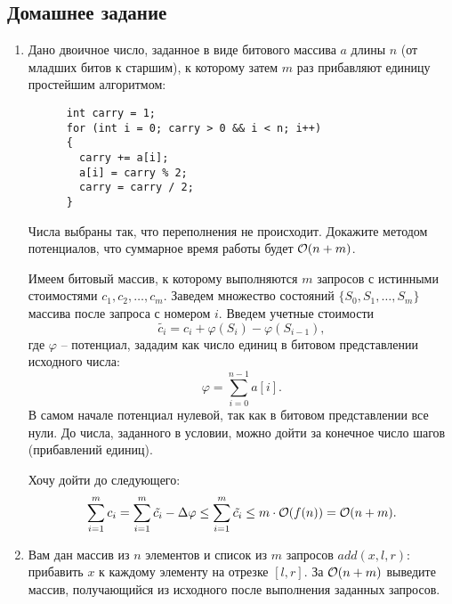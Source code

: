 \subsection{Домашнее задание}
\begin{enumerate}

  \item
    Дано двоичное число, заданное в виде битового массива $a$ длины $n$ (от младших битов к старшим), к которому
    затем $m$ раз прибавляют единицу простейшим алгоритмом:
    \begin{lstlisting}
      int carry = 1;
      for (int i = 0; carry > 0 && i < n; i++)
      {
        carry += a[i];
        a[i] = carry % 2;
        carry = carry / 2;
      }
    \end{lstlisting}
    Числа выбраны так, что переполнения не происходит. Докажите методом потенциалов, что суммарное время
    работы будет $\mathcal{O}(n + m)$.
    \begin{solution}
      Имеем битовый массив, к которому выполняются $m$ запросов с истинными стоимостями $c_1, c_2, \ldots, c_m$. Заведем множество состояний $\{S_0, S_1, \ldots, S_m\}$ массива после запроса с номером $i$. Введем учетные стоимости
      \begin{equation}
        \tilde{c_i} = c_i + \varphi(S_i) - \varphi(S_{i-1}),
      \end{equation}
      где $\varphi$ -- потенциал, зададим как число единиц в битовом представлении исходного числа:
      \begin{equation}
        \varphi = \sum_{i = 0}^{n - 1} a[i].
      \end{equation}
      В самом начале потенциал нулевой, так как в битовом представлении все нули. До числа, заданного в условии, можно дойти за конечное число шагов (прибавлений единиц).

      Хочу дойти до следующего:
      \begin{equation}
        \sum_{i = 1}^{m} c_i = \sum_{i = 1}^{m} \tilde{c_i} - \Delta \varphi \leq \sum_{i = 1}^{m} \tilde{c_i} \leq m \cdot \mathcal{O}(f(n)) = \mathcal{O}(n + m).
      \end{equation}
    \end{solution}

  \item
    Вам дан массив из $n$ элементов и
    список из $m$ запросов $add(x, l, r)$: прибавить $x$ к каждому
    элементу на отрезке $[l, r]$. За $\mathcal{O}(n + m)$ выведите массив,
    получающийся из исходного после выполнения заданных запросов.
      

\end{enumerate}
